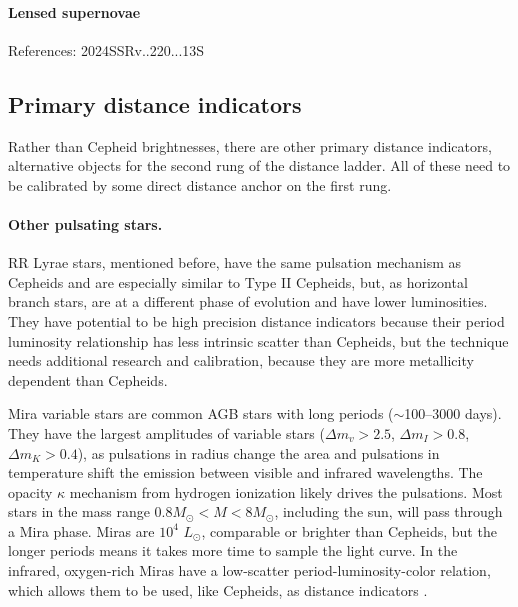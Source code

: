 \paragraph{Lensed supernovae}

References: 2024SSRv..220...13S


\subsection{Primary distance indicators}

Rather than Cepheid brightnesses, there are other primary distance indicators, alternative objects for the second rung of the distance ladder.  All of these need to be calibrated by some direct distance anchor on the first rung.

\paragraph{Other pulsating stars.} RR Lyrae stars, mentioned before, have the same pulsation mechanism as Cepheids and are especially similar to Type II Cepheids, but, as horizontal branch stars, are at a different phase of evolution and have lower luminosities.  They have potential to be high precision distance indicators because their period luminosity relationship has less intrinsic scatter than Cepheids, but the technique  needs additional research and calibration, because they are more metallicity dependent than Cepheids.

Mira variable stars are  common AGB stars with long periods ($\sim$100--3000 days).  They have the largest amplitudes of variable stars ($\Delta m_v > 2.5$, $\Delta m_I > 0.8$, $\Delta m_K > 0.4$), as pulsations in radius change the area and pulsations in temperature shift the emission between visible and infrared wavelengths. The opacity $\kappa$ mechanism from hydrogen ionization likely drives the pulsations.  Most stars in the mass range $0.8M_\odot < M < 8M_\odot$, including the sun,  will pass through a Mira phase.  Miras are $10^4$ $L_\odot$, comparable or brighter than Cepheids, but the longer periods means it takes more time to sample the light curve.  In the infrared, oxygen-rich Miras have a low-scatter period-luminosity-color relation, which allows them to be used, like Cepheids, as distance indicators \citep{2024arXiv240109581H}.

